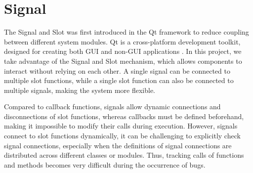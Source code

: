 \documentclass[
	english,
	ruledheaders=section,%
	class=report,%
	thesis={type=Report},%
	accentcolor=9c,%
	custommargins=true,%
	marginpar=false,%
	parskip=half-,%
	fontsize=11pt,%
	logofile={img/tuda_logo.pdf}, %
]{tudapub}
\begin{document}
\section{Signal}
\label{sec: signal}



The Signal and Slot was first introduced in the Qt framework to reduce coupling between different system modules. Qt is a cross-platform development toolkit, designed for creating both \ac{GUI} and non-\ac{GUI} applications \cite{Qt}. In this project, we take advantage of the Signal and Slot mechanism, which allows components to interact without relying on each other. A single signal can be connected to multiple slot functions, while a single slot function can also be connected to multiple signals, making the system more flexible.

Compared to callback functions, signals allow dynamic connections and disconnections of slot functions, whereas callbacks must be defined beforehand, making it impossible to modify their calls during execution. However, signals connect to slot functions dynamically, it can be challenging to explicitly check signal connections, especially when the definitions of signal connections are distributed across different classes or modules. Thus, tracking calls of functions and methods becomes very difficult during the occurrence of bugs.


\end{document}
